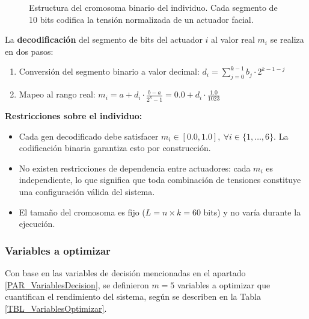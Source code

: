 \begin{figure}[H]
    \caption{Estructura del cromosoma binario del individuo. Cada segmento de 10 bits codifica la tensión normalizada de un actuador facial.}
    \label{FIG_Cromosoma}
\end{figure}

La \textbf{decodificación} del segmento de bits del actuador $i$ al valor real $m_i$ se realiza en dos pasos:
\begin{enumerate}
    \item Conversión del segmento binario a valor decimal: $d_i = \sum_{j=0}^{k-1} b_j \cdot 2^{k-1-j}$
    \item Mapeo al rango real: $m_i = a + d_i \cdot \frac{b - a}{2^k - 1} = 0.0 + d_i \cdot \frac{1.0}{1023}$
\end{enumerate}

\textbf{Restricciones sobre el individuo:}
\begin{itemize}
    \item Cada gen decodificado debe satisfacer $m_i \in [0.0, 1.0],\ \forall i \in \{1, \dots, 6\}$. La codificación binaria garantiza esto por construcción.
    \item No existen restricciones de dependencia entre actuadores: cada $m_i$ es independiente, lo que significa que toda combinación de tensiones constituye una configuración válida del sistema.
    \item El tamaño del cromosoma es fijo ($L = n \times k = 60$ bits) y no varía durante la ejecución.
\end{itemize}



\subsubsection{Variables a optimizar}
\label{PAR_VariablesOptimizar}
Con base en las variables de decisión mencionadas en el apartado \ref{PAR_VariablesDecision}, se definieron $m = 5$ variables a optimizar que cuantifican el rendimiento del sistema, según se describen en la Tabla \ref{TBL_VariablesOptimizar}.

